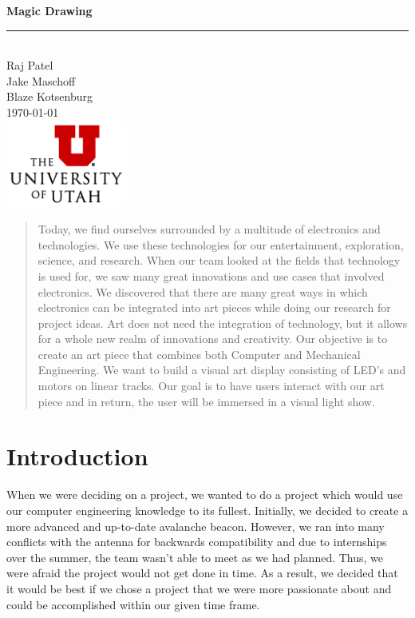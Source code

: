 \documentclass[11pt]{IEEEtran}
\begin{document}
\begin{titlepage}

  \newcommand{\HRule}{\rule{\linewidth}{0.5mm}} %
  
  \vspace*{\fill}
  \center %
  
  { \huge \bfseries Magic Drawing}\\
  \HRule \\[1cm]

  \large Raj Patel\\
  \large Jake Maschoff\\
  \large Blaze Kotsenburg\\[2cm]

  
  \normalsize \today\\[4cm]
  
  \includegraphics[width=0.30\textwidth]{logo.png}
  \vspace*{\fill}
  
\end{titlepage}

\begin{abstract}
Today, we find ourselves surrounded by a multitude of electronics and technologies. We use these technologies for our entertainment, exploration, science, and research. When our team looked at the fields that technology is used for, we saw many great innovations and use cases that involved electronics. We discovered that there are many great ways in which electronics can be integrated into art pieces while doing our research for project ideas. Art does not need the integration of technology, but it allows for a whole new realm of innovations and creativity. Our objective is to create an art piece that combines both Computer and Mechanical Engineering. We want to build a visual art display consisting of LED’s and motors on linear tracks. Our goal is to have users interact with our art piece and in return, the user will be immersed in a visual light show.
\end{abstract}

\section{Introduction}
When we were deciding on a project, we wanted to do a project which would use our computer engineering knowledge to its fullest. Initially, we decided to create a more advanced and up-to-date avalanche beacon. However, we ran into many conflicts with the antenna for backwards compatibility and due to internships over the summer, the team wasn’t able to meet as we had planned. Thus, we were afraid the project would not get done in time. As a result, we decided that it would be best if we chose a project that we were more passionate about and could be accomplished within our given time frame.
\end{document}
